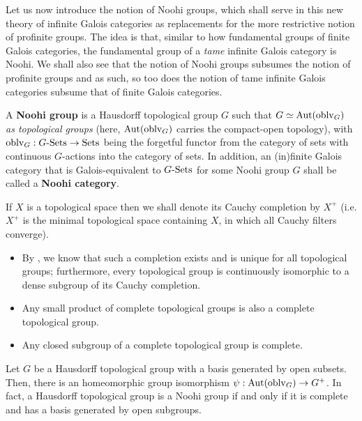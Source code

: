                 Let us now introduce the notion of Noohi groups, which shall serve in this new theory of infinite Galois categories as replacements for the more restrictive notion of profinite groups. The idea is that, similar to how fundamental groups of finite Galois categories, the fundamental group of a \textit{tame} infinite Galois category is Noohi. We shall also see that the notion of Noohi groups subsumes the notion of profinite groups and as such, so too does the notion of tame infinite Galois categories subsume that of finite Galois categories.
                \begin{definition} \label{def: noohi_groups}
                    \cite[Defintion 7.1.1]{bhatt_scholze_2014_pro_etale} A \textbf{Noohi group} is a Hausdorff topological group $G$ such that $G \simeq \mathrm{Aut}(\mathrm{oblv}_G)$ \textit{as topological groups} (here, $\mathrm{Aut}(\mathrm{oblv}_G)$ carries the compact-open topology), with $\mathrm{oblv}_G: G\text{-}\mathrm{Sets} \to \mathrm{Sets}$ being the forgetful functor from the category of sets with continuous $G$-actions into the category of sets. In addition, an (in)finite Galois category that is Galois-equivalent to $G\text{-}\mathrm{Sets}$ for some Noohi group $G$ shall be called a \textbf{Noohi category}.
                \end{definition}
                \begin{remark} \label{remark: completions_of_topological_groups}
                    If $X$ is a topological space then we shall denote its Cauchy completion by $X^+$ (i.e. $X^+$ is the minimal topological space containing $X$, in which all Cauchy filters converge). 
                        \begin{itemize}
                            \item By \cite[Theorem 3.6.10]{topological_groups_and_related_structures}, we know that such a completion exists and is unique for all topological groups; furthermore, every topological group is continuously isomorphic to a dense subgroup of its Cauchy completion. 
                            \item \cite[Theorem 3.6.22]{topological_groups_and_related_structures} Any small product of complete topological groups is also a complete topological group.
                            \item Any closed subgroup of a complete topological group is complete.
                        \end{itemize}
                \end{remark}
                \begin{proposition} \label{prop: noohi_groups_are_complete}
                    \cite[Proposition 7.1.5]{bhatt_scholze_2014_pro_etale} Let $G$ be a Hausdorff topological group with a basis generated by open subsets. Then, there is an homeomorphic group isomorphism $\psi: \mathrm{Aut}(\mathrm{oblv}_G) \to G^+$. In fact, a Hausdorff topological group is a Noohi group if and only if it is complete and has a basis generated by open subgroups.
                \end{proposition}
